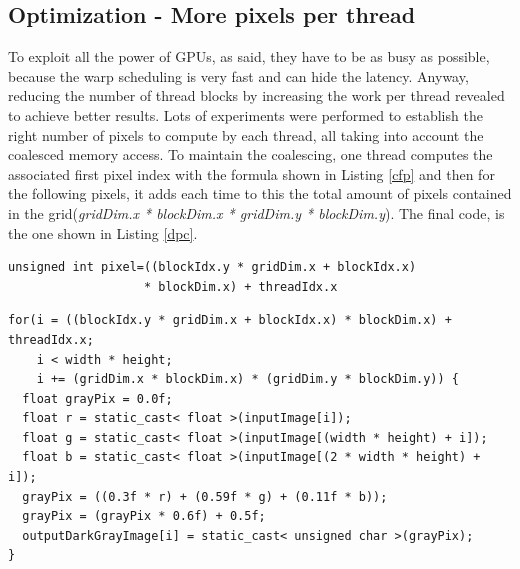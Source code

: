 \documentclass[a4paper]{article}
\begin{document}
\subsection{Optimization - More pixels per thread}
\label{sec:dfm}
To exploit all the power of GPUs, as said, they have to be as busy as possible, because the warp scheduling is very fast and can hide the latency. Anyway, reducing the number of thread blocks by increasing the work per thread revealed to achieve better results. Lots of experiments were performed to establish the right number of pixels to compute by each thread, all taking into account the coalesced memory access. To maintain the coalescing, one thread computes the associated first pixel index with the formula shown in Listing \ref{cfp} and then for the following pixels, it adds each time to this the total amount of pixels contained in the grid(\textit{gridDim.x * blockDim.x * gridDim.y * blockDim.y}). The final code, is the one shown in Listing \ref{dpc}. 

\begin{lstlisting}[label=cfp, caption=Corresponding first pixel]
unsigned int pixel=((blockIdx.y * gridDim.x + blockIdx.x) 
                   * blockDim.x) + threadIdx.x
\end{lstlisting}
\FloatBarrier

\begin{lstlisting}[label=dpc, caption=Darker Parallel Code]
for(i = ((blockIdx.y * gridDim.x + blockIdx.x) * blockDim.x) + threadIdx.x; 
    i < width * height; 
    i += (gridDim.x * blockDim.x) * (gridDim.y * blockDim.y)) {
  float grayPix = 0.0f;
  float r = static_cast< float >(inputImage[i]);
  float g = static_cast< float >(inputImage[(width * height) + i]);
  float b = static_cast< float >(inputImage[(2 * width * height) + i]);
  grayPix = ((0.3f * r) + (0.59f * g) + (0.11f * b));
  grayPix = (grayPix * 0.6f) + 0.5f;
  outputDarkGrayImage[i] = static_cast< unsigned char >(grayPix);
}
\end{lstlisting}
\FloatBarrier
\end{document}
